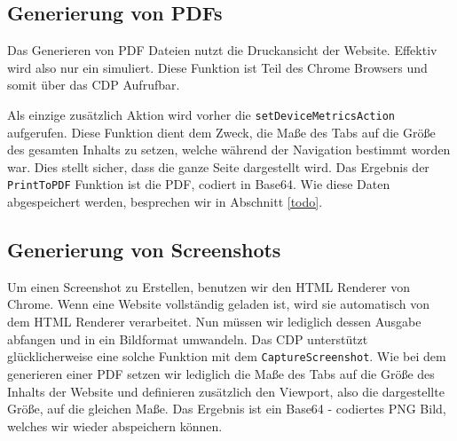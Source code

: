 \subsection{Generierung von PDFs} \label{scraper:subsec:go:pdf}
Das Generieren von PDF Dateien nutzt die Druckansicht der Website. Effektiv wird also nur ein  simuliert. Diese Funktion ist Teil des Chrome Browsers und somit über das CDP Aufrufbar.  
Als einzige zusätzlich Aktion wird vorher die \verb|setDeviceMetricsAction| aufgerufen. Diese Funktion dient dem Zweck, die Maße des Tabs auf die Größe des gesamten Inhalts zu setzen, welche während der Navigation bestimmt worden war. Dies stellt sicher, dass die ganze Seite dargestellt wird. Das Ergebnis der \verb|PrintToPDF| Funktion ist die PDF, codiert in Base64. Wie diese Daten abgespeichert werden, besprechen wir in Abschnitt \ref{todo}.
\subsection{Generierung von Screenshots} \label{scraper:subsec:go:screenshot}
Um einen Screenshot zu Erstellen, benutzen wir den HTML Renderer von Chrome. Wenn eine Website vollständig geladen ist, wird sie automatisch von dem HTML Renderer verarbeitet. Nun müssen wir lediglich dessen Ausgabe abfangen und in ein Bildformat umwandeln. Das CDP unterstützt glücklicherweise eine solche Funktion mit dem \verb|CaptureScreenshot|. Wie bei dem generieren einer PDF setzen wir lediglich die Maße des Tabs auf die Größe des Inhalts der Website und definieren zusätzlich den Viewport, also die dargestellte Größe, auf die gleichen Maße. Das Ergebnis ist ein Base64 - codiertes PNG Bild, welches wir wieder abspeichern können.














